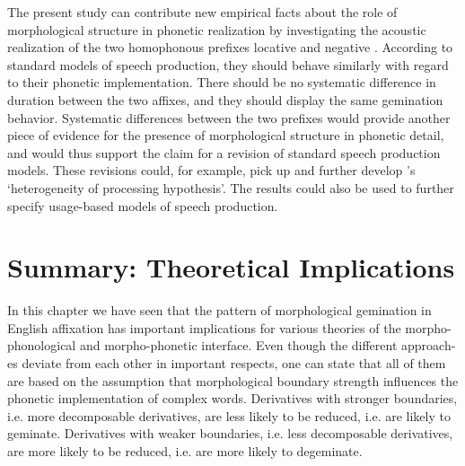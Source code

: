 { 

 
 
 The present study can contribute new empirical facts about the role of morphological structure in phonetic realization by investigating the acoustic realization of the two homophonous prefixes locative and negative . According to standard models of speech production, they should behave similarly with regard to their phonetic implementation. There should be no systematic difference in duration between the two affixes, and they should display the same gemination behavior. Systematic differences between the two prefixes would provide another piece of evidence for the presence of morphological structure in phonetic detail, and would thus support the claim for a revision of standard speech production models. These revisions could, for example, pick up and further develop \citeauthor{CohenGoldberg.2013}'s  `heterogeneity of processing hypothesis'. The results could also be used to further specify usage-based models of speech production.



 
 




\section{Summary: Theoretical Implications}\label{summary predictions}

 In this chapter we have seen that the pattern of morphological gemination in English affixation has important implications for various theories of the morpho-phonological and morpho-phonetic interface. Even though the different approach-es deviate from each other in important respects, one can state that all of them are based on the assumption that morphological boundary strength influences the phonetic implementation of complex words. Derivatives with stronger boundaries, i.e. more decomposable derivatives, are less likely to be reduced, i.e. are likely to geminate. Derivatives with weaker boundaries, i.e. less decomposable derivatives, are more likely to be reduced, i.e. are more likely to degeminate. 
 

}
